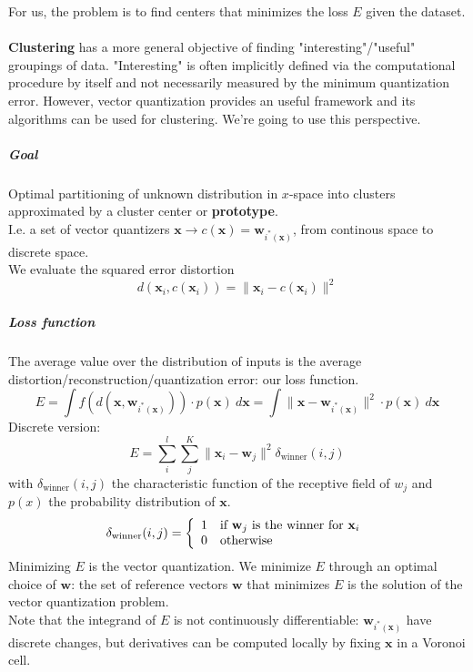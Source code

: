 \documentclass[10pt]{report}
\begin{document}
For us, the problem is to find centers that minimizes the loss $E$ given the dataset.\\\\
\textbf{Clustering} has a more general objective of finding "interesting"/"useful" groupings of data. "Interesting" is often implicitly defined via the computational procedure by itself and not necessarily measured by the minimum quantization error. However, vector quantization provides an useful framework and its algorithms can be used for clustering. We're going to use this perspective.
\subparagraph{Goal} Optimal partitioning of unknown distribution in $x$-space into clusters approximated by a cluster center or \textbf{prototype}.\\
I.e. a set of vector quantizers $\mathbf{x}\rightarrow c(\mathbf{x}) = \mathbf{w}_{i^*(\mathbf{x})}$, from continous space to discrete space.\\
We evaluate the squared error distortion $$d(\mathbf{x}_i,c(\mathbf{x}_i)) = \|\mathbf{x}_i-c(\mathbf{x}_i)\|^2$$
\subparagraph{Loss function} The average value over the distribution of inputs is the average distortion/reconstruction/quantization error: our loss function. $$E = \int f(d(\mathbf{x},\mathbf{w}_{i^*(\mathbf{x})}))\cdot p(\mathbf{x})\:d\mathbf{x}= \int\|\mathbf{x}-\mathbf{w}_{i^*(\mathbf{x})}\|^2\cdot p(\mathbf{x})\:d\mathbf{x}$$
Discrete version: $$E = \sum_i^l\sum_j^K\|\mathbf{x}_i-\mathbf{w}_j\|^2\delta_{\text{winner}}(i,j)$$ with $\delta_{\text{winner}}(i,j)$ the characteristic function of the receptive field of $w_j$ and $p(x)$ the probability distribution of $\mathbf{x}$. $$\delta_{\text{winner}}(i,j) = \left\{\begin{array}{l l}
1&\text{if }\mathbf{w}_j\text{ is the winner for }\mathbf{x}_i\\
0&\text{otherwise}
\end{array}\right.$$
Minimizing $E$ is the vector quantization. We minimize $E$ through an optimal choice of $\mathbf{w}$: the set of reference vectors $\mathbf{w}$ that minimizes $E$ is the solution of the vector quantization problem.\\
Note that the integrand of $E$ is not continuously differentiable: $\mathbf{w}_{i^*(\mathbf{x})}$ have discrete changes, but derivatives can be computed locally by fixing $\mathbf{x}$ in a Voronoi cell.
\end{document}
